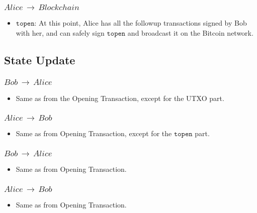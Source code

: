 \subsubsection{$Alice\,\to\,Blockchain$}
\begin{itemize}[leftmargin=4\parindent]
    \item $\texttt{topen}$: At this point, Alice has all the followup transactions signed by Bob with her, and can safely sign $\texttt{topen}$ and broadcast it on the Bitcoin network.
\end{itemize}

\subsection{State Update}
\subsubsection{$Bob\,\to\,Alice$}
\begin{itemize}[leftmargin=4\parindent]
    \item Same as from the Opening Transaction, except for the UTXO part.
\end{itemize}
\subsubsection{$Alice\,\to\,Bob$}
\begin{itemize}[leftmargin=4\parindent]
\item Same as from Opening Transaction, except for the $\texttt{topen}$ part.
\end{itemize}
\subsubsection{$Bob\,\to\,Alice$}
\begin{itemize}[leftmargin=4\parindent]
    \item Same as from Opening Transaction.
\end{itemize}
\subsubsection{$Alice\,\to\,Bob$}
\begin{itemize}[leftmargin=4\parindent]
    \item Same as from Opening Transaction.
\end{itemize}
